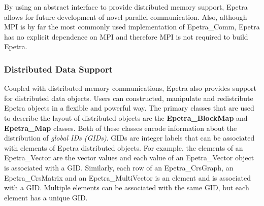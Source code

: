 \documentclass[12pt,relax]{EpetraUserGuide}
\newcommand{\comm}{Epetra\_Comm}
\newcommand{\map}{Epetra\_Map}
\newcommand{\blockmap}{Epetra\_BlockMap}
\renewcommand{\vector}{Epetra\_Vector}
\newcommand{\multivector}{Epetra\_MultiVector}
\newcommand{\crsgraph}{Epetra\_CrsGraph}
\newcommand{\crsmatrix}{Epetra\_CrsMatrix}
\begin{document}
By using an abstract interface to provide distributed memory support,
Epetra allows for future development of novel parallel communication.
Also, although MPI is by far the most commonly used implementation of
\comm{}, Epetra has no explicit dependence on MPI and therefore MPI is
not required to build Epetra.

\subsubsection{Distributed Data Support}

Coupled with distributed memory communications, Epetra also provides
support for distributed data objects.  Users can constructed,
manipulate and redistribute Epetra objects in a flexible and powerful
way.  The primary classes that are used to describe the layout of
distributed objects are the {\bf \blockmap{}} and {\bf \map{}} classes.  Both of
these classes encode information about the distribution of {\it global
IDs (GIDs)}. GIDs are integer labels that can be associated
with elements of  Epetra distributed objects.  For example, the
elements of an \vector{} are the vector values and each
value of an \vector{} object is associated with a GID.
Similarly, each row of an \crsgraph{}, an \crsmatrix{} and an
\multivector{} is an element and is associated with a GID.  Multiple
elements can be associated with the same GID, but each element has a
unique GID.
\end{document}
